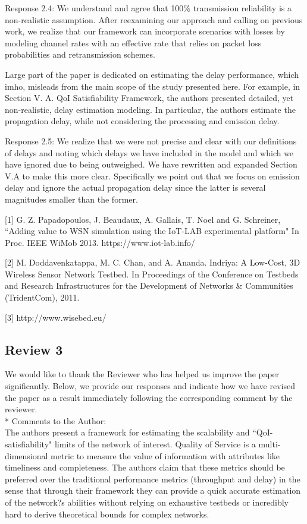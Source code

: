 \documentclass[12pt, letterpaper, onecolumn]{IEEEtran}
\begin{document}
{\color{blue}
Response 2.4: We understand and agree that 100\% transmission reliability is a non-realistic assumption. After reexamining our approach and calling on previous work, we realize that our framework can incorporate scenarios with losses by modeling channel rates with an effective rate that relies on packet loss probabilities and retransmission schemes.
}

Large part of the paper is dedicated on estimating the delay performance, which imho, misleads from the main scope of the study presented here. For example, in Section V. A. QoI Satisfiability Framework, the authors presented detailed, yet non-realistic, delay estimation modeling. In particular, the authors estimate the propagation delay, while not considering the processing and emission delay. 

{\color{blue}
Response 2.5: We realize that we were not precise and clear with our definitions of delays and noting which delays we have included in the model and which we have ignored due to being outweighed. We have rewritten and expanded Section V.A to make this more clear. Specifically we point out that we focus on emission delay and ignore the actual propagation delay since the latter is several magnitudes smaller than the former.
}

[1] G. Z. Papadopoulos, J. Beaudaux, A. Gallais, T. Noel and G. Schreiner, ``Adding value to WSN simulation using the IoT-LAB experimental platform" In Proc. IEEE WiMob 2013.
 https://www.iot-lab.info/

[2] M. Doddavenkatappa, M. C. Chan, and A. Ananda. Indriya: A Low-Cost, 3D Wireless Sensor Network Testbed. In Proceedings of the Conference on Testbeds and Research Infrastructures for the Development of Networks \& Communities (TridentCom), 2011.

[3] http://www.wisebed.eu/

\subsection{Review 3}

{ \color {blue}We would like to thank the Reviewer who has helped us improve the paper significantly. Below, we provide our responses and indicate how we have revised the paper as a result immediately following the corresponding comment by the reviewer.}\\

\noindent** Comments to the Author: \\
The authors present a framework for estimating the scalability and ``QoI-satisfiability" limits of the network of interest. Quality of Service is a multi-dimensional metric to measure the value of information with attributes like timeliness and completeness. The authors claim that these metrics should be preferred over the traditional performance metrics (throughput and delay) in the sense that through their framework they can provide a quick accurate estimation of the network?s abilities without relying on exhaustive testbeds or incredibly hard to derive theoretical bounds for complex networks.
\end{document}
